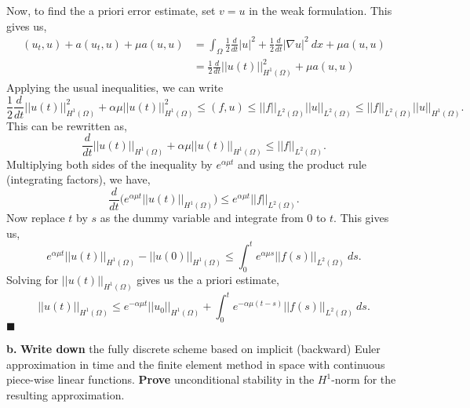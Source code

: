 \documentclass[11pt]{article}
\begin{document}
Now, to find the a priori error estimate, set $v = u$ in the weak formulation.
This gives us,
\begin{align*}
    (u_t, u) + a(u_t , u) + \mu a(u,u) &= \int_\Omega \frac{1}{2} \frac{d}{dt} |u|^2 + \frac{1}{2} \frac{d}{dt} |\nabla u|^2 \: dx + \mu a(u,u) \\
    &= \frac{1}{2} \frac{d}{dt} ||u(t)||^2_{H^1(\Omega)} + \mu a(u,u)
\end{align*}
Applying the usual inequalities, we can write 
\begin{equation*}
    \frac{1}{2} \frac{d}{dt} ||u(t)||^2_{H^1(\Omega)} + \alpha\mu ||u(t)||^2_{H^1(\Omega)} \leq (f,u) \leq ||f||_{L^2(\Omega)} ||u||_{L^2(\Omega)} \leq ||f||_{L^2(\Omega)} ||u||_{H^1(\Omega)}.
\end{equation*}
This can be rewritten as,
\begin{equation*}
    \frac{d}{dt} ||u(t)||_{H^1(\Omega)} + \alpha\mu ||u(t)||_{H^1(\Omega)} \leq ||f||_{L^2(\Omega)}.
\end{equation*}
Multiplying both sides of the inequality by $e^{\alpha\mu t}$ and using the product rule (integrating factors), we have,
\begin{equation*}
    \frac{d}{dt} \big( e^{\alpha\mu t}||u(t)||_{H^1(\Omega)} \big) \leq e^{\alpha\mu t} ||f||_{L^2(\Omega)}.
\end{equation*}
Now replace $t$ by $s$ as the dummy variable and integrate from $0$ to $t$.
This gives us,
\begin{equation*}
    e^{\alpha\mu t}||u(t)||_{H^1(\Omega)} - ||u(0)||_{H^1(\Omega)} \leq \int_0^t e^{\alpha\mu s} ||f(s)||_{L^2(\Omega)} \: ds.
\end{equation*}
Solving for $||u(t)||_{H^1(\Omega)}$ gives us the a priori estimate,
\begin{equation*}
    ||u(t)||_{H^1(\Omega)} \leq e^{-\alpha\mu t} ||u_0||_{H^1(\Omega)} + \int_0^t e^{-\alpha\mu (t - s)} ||f(s)||_{L^2(\Omega)} \: ds.
\end{equation*}
$\blacksquare$


\vskip 2cm



{\bf b.} {\bf Write down} the fully discrete scheme based on implicit (backward) Euler approximation in time and the finite element method in space with continuous piece-wise linear functions. \textbf{Prove} unconditional stability in the $H^1$-norm for the resulting approximation.


\vskip 1cm
\end{document}
